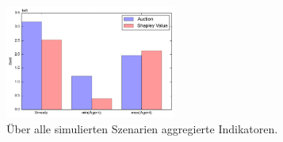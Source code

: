 \begin{figure}
  \centering
  \includegraphics[width=0.5\textwidth]{results.png}
  \caption{Über alle simulierten Szenarien aggregierte Indikatoren.}
  \label{results}
\end{figure} 

